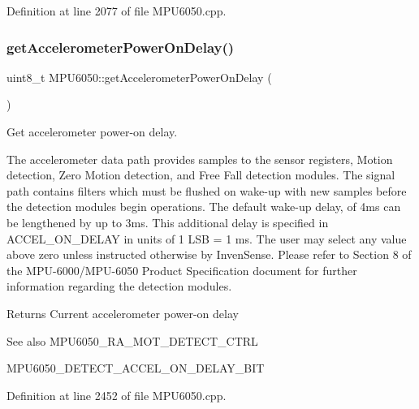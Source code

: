 Definition at line 2077 of file M\+P\+U6050.\+cpp.

\mbox{\label{classMPU6050_aae903df2accc687423f9cd0a78f9cd32}} 
\subsubsection{\texorpdfstring{getAccelerometerPowerOnDelay()}{getAccelerometerPowerOnDelay()}}
{\footnotesize\ttfamily uint8\+\_\+t M\+P\+U6050\+::get\+Accelerometer\+Power\+On\+Delay (\begin{DoxyParamCaption}{ }\end{DoxyParamCaption})}



Get accelerometer power-\/on delay. 

The accelerometer data path provides samples to the sensor registers, Motion detection, Zero Motion detection, and Free Fall detection modules. The signal path contains filters which must be flushed on wake-\/up with new samples before the detection modules begin operations. The default wake-\/up delay, of 4ms can be lengthened by up to 3ms. This additional delay is specified in A\+C\+C\+E\+L\+\_\+\+O\+N\+\_\+\+D\+E\+L\+AY in units of 1 L\+SB = 1 ms. The user may select any value above zero unless instructed otherwise by Inven\+Sense. Please refer to Section 8 of the M\+P\+U-\/6000/\+M\+P\+U-\/6050 Product Specification document for further information regarding the detection modules. \begin{DoxyReturn}{Returns}
Current accelerometer power-\/on delay 
\end{DoxyReturn}
\begin{DoxySeeAlso}{See also}
M\+P\+U6050\+\_\+\+R\+A\+\_\+\+M\+O\+T\+\_\+\+D\+E\+T\+E\+C\+T\+\_\+\+C\+T\+RL 

M\+P\+U6050\+\_\+\+D\+E\+T\+E\+C\+T\+\_\+\+A\+C\+C\+E\+L\+\_\+\+O\+N\+\_\+\+D\+E\+L\+A\+Y\+\_\+\+B\+IT 
\end{DoxySeeAlso}


Definition at line 2452 of file M\+P\+U6050.\+cpp.

\mbox{\label{classMPU6050_ace244415128ad7a38293ad6808b7face}} 
